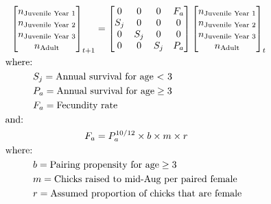 \documentclass[12pt]{article}
\begin{document}
\begin{preview}
\begin{align}
\begin{bmatrix}
n_{\text{Juvenile Year 1}}
\\n_{\text{Juvenile Year 2}}
\\n_{\text{Juvenile Year 3}}
\\n_{\text{Adult}}  
\end{bmatrix}_{t+1}
& =
\begin{bmatrix}
 0 & 0 & 0 & F_{a} \\ 
 S_{j} & 0 & 0 & 0 \\ 
 0 & S_{j} & 0 & 0 \\ 
 0 & 0 & S_{j} & P_{a} \\ 
\end{bmatrix}
\begin{bmatrix}
n_{\text{Juvenile Year 1}}
\\n_{\text{Juvenile Year 2}} 
\\n_{\text{Juvenile Year 3}}
\\n_{\text{Adult}}  
\end{bmatrix}_{t} \nonumber \\
& \hspace{-1.3in} \text{where:} \nonumber \\
& \hspace{-0.9in} S_{j} = \text{Annual survival for age $<$ 3} \nonumber \\
& \hspace{-0.9in} P_{a} = \text{Annual survival for age} \ge 3 \nonumber \\
& \hspace{-0.9in} F_{a} = \text{Fecundity rate} \nonumber \\
& \hspace{-1.3in} \text{and:} \nonumber \\
F_{a} & = P_{a}^{10/12} \times b \times m \times r \nonumber \\
& \hspace{-1.3in} \text{where:} \nonumber \\
& \hspace{-0.9in} b = \text{Pairing propensity for age} \ge 3 \nonumber \\
& \hspace{-0.9in} m = \text{Chicks raised to mid-Aug per paired female} \nonumber \\
& \hspace{-0.9in} r = \text{Assumed proportion of chicks that are female} \nonumber 
\end{align} 
\end{preview}
\end{document}
